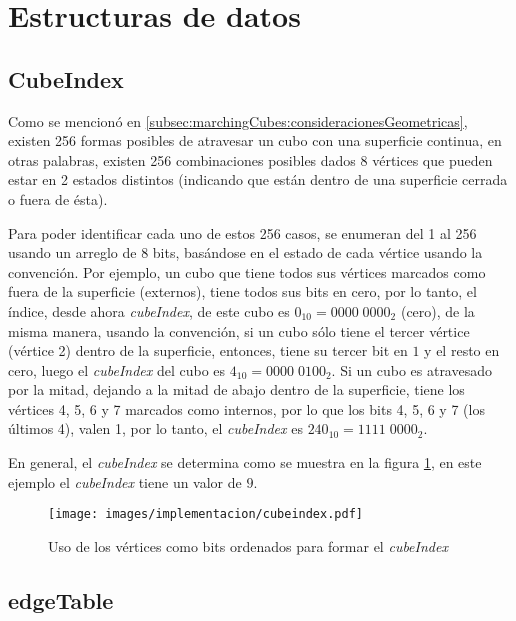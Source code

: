 \section{Estructuras de datos}
\label{ch:implementacion:sec:estructurasDeDatos}

\subsection{CubeIndex}
\label{ch:implementacion:sec:CubeIndex}

Como se mencionó en \ref{subsec:marchingCubes:consideracionesGeometricas}, existen 256 formas posibles de atravesar un cubo con una superficie continua, en otras palabras, existen 256 combinaciones posibles dados 8 vértices que pueden estar en 2 estados distintos (indicando que están dentro de una superficie cerrada o fuera de ésta).

Para poder identificar cada uno de estos 256 casos, se enumeran del 1 al 256 usando un arreglo de 8 bits, basándose en el estado de cada vértice usando la convención. Por ejemplo, un cubo que tiene todos sus vértices marcados como fuera de la superficie (externos), tiene todos sus bits en cero, por lo tanto, el índice, desde ahora \emph{cubeIndex}, de este cubo es \hbox{$0_{10} = 0000 \; 0000_{2}$} (cero), de la misma manera, usando la convención, si un cubo sólo tiene el tercer vértice (vértice 2) dentro de la superficie, entonces, tiene su tercer bit en $1$ y el resto en cero, luego el \emph{cubeIndex} del cubo es $4_{10} = 0000 \; 0100_{2}$. Si un cubo es atravesado por la mitad, dejando a la mitad de abajo dentro de la superficie, tiene los vértices 4, 5, 6 y 7 marcados como internos, por lo que los bits 4, 5, 6 y 7 (los últimos 4), valen 1, por lo tanto, el \emph{cubeIndex} es $240_{10} = 1111 \; 0000_{2}$.

En general, el \emph{cubeIndex} se determina como se muestra en la figura \ref{f:ch:implementacion:sec:CubeIndex:cubeindex:cubeindex}, en este ejemplo el \emph{cubeIndex} tiene un valor de $9$.

\begin{figure}[hbt]
	\centering
	\fbox
	{
		\texttt{[image: images/implementacion/cubeindex.pdf]}
	}
	\caption{Uso de los vértices como bits ordenados para formar el \emph{cubeIndex}}
	\label{f:ch:implementacion:sec:CubeIndex:cubeindex:cubeindex}
\end{figure}

\subsection{edgeTable}
\label{ch:implementacion:sec:edgeTable}


